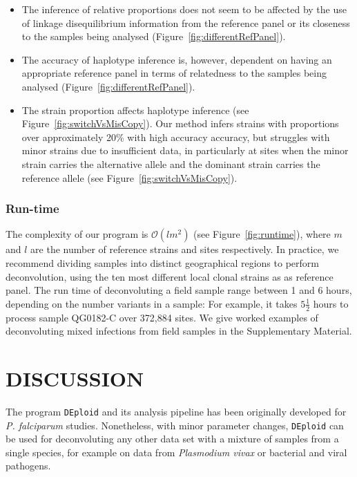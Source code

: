 \documentclass{nature}
\begin{document}
\begin{itemize}

\item The inference of relative proportions does not seem to be affected by the use of linkage disequilibrium information from the reference panel or its closeness to the samples being analysed (Figure~\ref{fig:differentRefPanel}).

\item The accuracy of haplotype inference is, however, dependent on having an appropriate reference panel in terms of relatedness to the samples being analysed (Figure~\ref{fig:differentRefPanel}).

\item The strain proportion affects haplotype inference (see Figure~\ref{fig:switchVsMisCopy}). Our method infers strains with proportions over approximately 20\% with high accuracy  accuracy, but struggles with minor strains due to insufficient data, in particularly at sites when the minor strain carries the alternative allele and the dominant strain carries the reference allele (see Figure~\ref{fig:switchVsMisCopy}).

\end{itemize}




\subsubsection*{Run-time}

The complexity of our program is $\mathcal{O}(lm^2)$ (see Figure~\ref{fig:runtime}), where $m$ and $l$ are the number of reference strains and sites respectively. In practice, we recommend dividing samples into distinct geographical regions to perform deconvolution, using the ten most different local clonal strains as as reference panel. The run time of deconvoluting a field sample range between 1 and 6 hours, depending on the number variants in a sample: For example, it takes $5\frac{1}{2}$ hours to process sample {\textmd QG0182-C} over 372,884 sites.  We give worked examples of deconvoluting mixed infections from field samples in the Supplementary Material.



\section*{DISCUSSION}

The program \texttt{DEploid} and its analysis pipeline has been originally developed for {\it P. falciparum} studies. Nonetheless, with minor parameter changes, \texttt{DEploid} can be used for deconvoluting any other data set with a mixture of samples from a single species, for example on data from {\it Plasmodium vivax} \cite{Pearson2016} or bacterial and viral pathogens.
\end{document}
